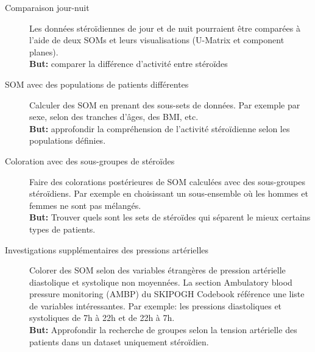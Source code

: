 	\begin{description}
	\item [Comparaison jour-nuit]
	Les données stéroïdiennes de jour et de nuit pourraient être comparées à l'aide de deux SOMs et leurs visualisations (U-Matrix et component planes).\\
	\textbf{But:} comparer la différence d'activité entre stéroïdes

	\item [SOM avec des populations de patients différentes]
	Calculer des SOM en prenant des sous-sets de données. Par exemple par sexe, selon des tranches d'âges, des BMI, etc.\\
	\textbf{But:} approfondir la compréhension de l'activité stéroïdienne selon les populations définies.
	
	\item [Coloration avec des sous-groupes de stéroïdes]
	Faire des colorations postérieures de SOM calculées avec des sous-groupes stéroïdiens. Par exemple en choisissant un sous-ensemble où les hommes et femmes ne sont pas mélangés.\\
	\textbf{But:} Trouver quels sont les sets de stéroïdes qui séparent le mieux certains types de patients.

	\item[Investigations supplémentaires des pressions artérielles]
	Colorer des SOM selon des variables étrangères de pression artérielle diastolique et systolique non moyennées. La section Ambulatory blood pressure monitoring (AMBP) du SKIPOGH Codebook référence une liste de variables intéressantes. Par exemple: les pressions diastoliques et systoliques de 7h à 22h et de 22h à 7h.\\     
	\textbf{But:} Approfondir la recherche de groupes selon la tension artérielle des patients dans un dataset uniquement stéroïdien.

	\end{description}


